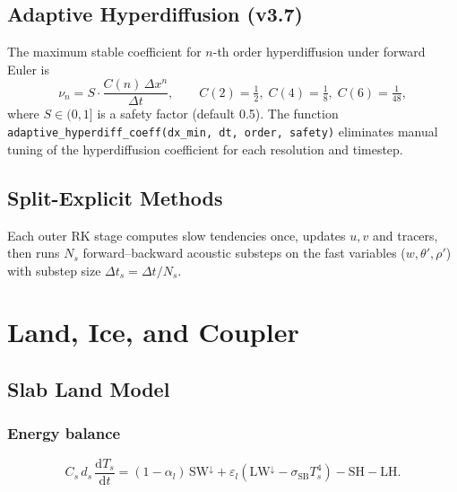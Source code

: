 \documentclass[11pt,a4paper]{article}
\newcommand{\dd}{\mathrm{d}}
\newcommand{\SB}{\sigma_{\mathrm{SB}}}
\begin{document}
\subsection{Adaptive Hyperdiffusion (v3.7)}

The maximum stable coefficient for $n$-th order hyperdiffusion under forward Euler is
\begin{equation}
  \nu_n = S\cdot\frac{C(n)\,\Delta x^n}{\Delta t},
  \qquad
  C(2)=\tfrac{1}{2},\;C(4)=\tfrac{1}{8},\;C(6)=\tfrac{1}{48},
\end{equation}
where $S\in(0,1]$ is a safety factor (default 0.5).  The function \texttt{adaptive\_hyperdiff\_coeff(dx\_min, dt, order, safety)} eliminates manual tuning of the hyperdiffusion coefficient for each resolution and timestep.

\subsection{Split-Explicit Methods}

Each outer RK stage computes slow tendencies once, updates $u,v$ and tracers, then runs $N_s$ forward--backward acoustic substeps on the fast variables ($w,\theta',\rho'$) with substep size $\Delta t_s=\Delta t/N_s$.

\section{Land, Ice, and Coupler}

\subsection{Slab Land Model}

\subsubsection{Energy balance}
\begin{equation}
  C_s\,d_s\,\frac{\dd T_s}{\dd t} = (1-\alpha_l)\,\mathrm{SW}^\downarrow + \varepsilon_l(\mathrm{LW}^\downarrow-\SB T_s^4) - \mathrm{SH} - \mathrm{LH}.
\end{equation}
\end{document}
